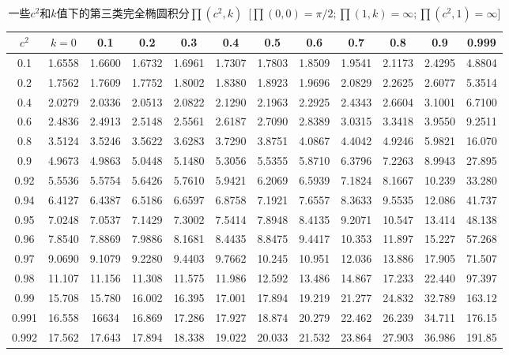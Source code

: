 \begin{table}[htbp]%
	  \centering
	\caption{一些$c^2$和$k$值下的第三类完全椭圆积分$\prod(c^2,k)$\ [$\prod(0,0)=\pi/2;\prod(1,k)=\infty;\prod(c^2,1)=\infty$]}
	\begin{tabular}{|c|c|c|c|c|c|c|c|c|c|c|c|}
		\hline
		$c^2$ & $k=0$    & 0.1    & 0.2    & 0.3    & 0.4    & 0.5    & 0.6    & 0.7    & 0.8    & 0.9    & 0.999  \\ \hline\hline
		0.1   & 1.6558 & 1.6600 & 1.6732 & 1.6961 & 1.7307 & 1.7803 & 1.8509 & 1.9541 & 2.1173 & 2.4295 & 4.8804 \\ 
		0.2   & 1.7562 & 1.7609 & 1.7752 & 1.8002 & 1.8380 & 1.8923 & 1.9696 & 2.0829 & 2.2625 & 2.6077 & 5.3514 \\ 
		0.4   & 2.0279 & 2.0336 & 2.0513 & 2.0822 & 2.1290 & 2.1963 & 2.2925 & 2.4343 & 2.6604 & 3.1001 & 6.7100 \\ 
		0.6   & 2.4836 & 2.4913 & 2.5148 & 2.5561 & 2.6187 & 2.7090 & 2.8389 & 3.0315 & 3.3418 & 3.9550 & 9.2511 \\ 
		0.8   & 3.5124 & 3.5246 & 3.5622 & 3.6283 & 3.7290 & 3.8751 & 4.0867 & 4.4042 & 4.9246 & 5.9821 & 16.070 \\ 
		0.9   & 4.9673 & 4.9863 & 5.0448 & 5.1480 & 5.3056 & 5.5355 & 5.8710 & 6.3796 & 7.2263 & 8.9943 & 27.895 \\ 
		0.92  & 5.5536 & 5.5754 & 5.6426 & 5.7610 & 5.9421 & 6.2069 & 6.5939 & 7.1824 & 8.1667 & 10.239 & 33.280 \\ 
		0.94  & 6.4127 & 6.4387 & 6.5186 & 6.6597 & 6.8758 & 7.1921 & 7.6557 & 8.3633 & 9.5535 & 12.086 & 41.737 \\ 
		0.95  & 7.0248 & 7.0537 & 7.1429 & 7.3002 & 7.5414 & 7.8948 & 8.4135 & 9.2071 & 10.547 & 13.414 & 48.138 \\ 
		0.96  & 7.8540 & 7.8869 & 7.9886 & 8.1681 & 8.4435 & 8.8475 & 9.4417 & 10.353 & 11.897 & 15.227 & 57.268 \\ 
		0.97  & 9.0690 & 9.1079 & 9.2280 & 9.4403 & 9.7662 & 10.245 & 10.951 & 12.036 & 13.886 & 17.905 & 71.507 \\ 
		0.98  & 11.107 & 11.156 & 11.308 & 11.575 & 11.986 & 12.592 & 13.486 & 14.867 & 17.233 & 22.440 & 97.397 \\ 
		0.99  & 15.708 & 15.780 & 16.002 & 16.395 & 17.001 & 17.894 & 19.219 & 21.277 & 24.832 & 32.789 & 163.12 \\ 
		0.991 & 16.558 & 16634  & 16.869 & 17.286 & 17.927 & 18.874 & 20.279 & 22.462 & 26.239 & 34.711 & 176.15 \\ 
		0.992 & 17.562 & 17.643 & 17.894 & 18.338 & 19.022 & 20.033 & 21.532 & 23.864 & 27.903 & 36.986 & 191.85 \\

\end{tabular}
\end{table}

